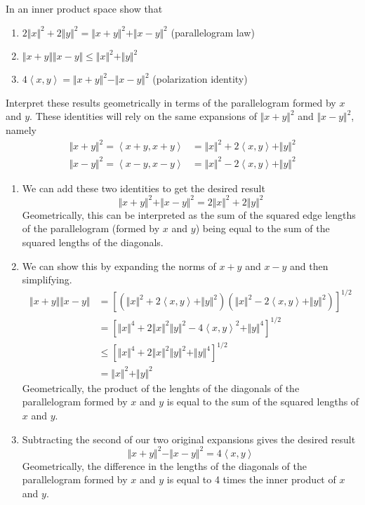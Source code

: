\documentclass[10pt]{amsart}
\theoremstyle{plain}
\newenvironment{exercise}[1]{%
  \renewcommand\themanualtheoreminner{#1}%
  \manualtheoreminner
}{\endmanualtheoreminner}
\theoremstyle{definition}
\newcommand{\<}{\langle}
\renewcommand{\>}{\rangle}
\begin{document}
\begin{exercise}{1.12}
	In an inner product space show that
	\begin{enumerate}
		\item $2\Vert{x}\Vert^2+2\Vert{y}\Vert^2=\Vert{x+y}\Vert^2+\Vert{x-y}\Vert^2$ (parallelogram law)
		\item $\Vert{x+y}\Vert \Vert{x-y}\Vert\leq\Vert{x}\Vert^2+\Vert{y}\Vert^2$
		\item $4\left\langle x,y \right\rangle=\Vert{x+y}\Vert^2-\Vert{x-y}\Vert^2$ (polarization identity)
	\end{enumerate}
	Interpret these results geometrically in terms of the parallelogram formed by $x$ and $y$.
\end{exercise}
	These identities will rely on the same expansions of $\Vert{x+y}\Vert^2$ and $\Vert{x-y}\Vert^2$, namely
	\begin{align*}
		\Vert{x+y}\Vert^2 = \left\langle x+y,x+y \right\rangle &= \Vert{x}\Vert^2 + 2\left\langle x,y \right\rangle+\Vert{y}\Vert^2 \\
		\Vert{x-y}\Vert^2 = \left\langle x-y,x-y \right\rangle &= \Vert{x}\Vert^2 -2\left\langle x,y \right\rangle + \Vert{y}\Vert^2
	\end{align*}
\begin{enumerate}
	\item We can add these two identities to get the desired result
	\[
	\Vert{x+y}\Vert^2 + \Vert{x-y}\Vert^2 = 2\Vert{x}\Vert^2 + 2\Vert{y}\Vert^2
	\] 
	Geometrically, this can be interpreted as the sum of the squared edge lengths of the parallelogram (formed by $x$ and $y$) being equal to the sum of the squared lengths of the diagonals.

	\item 
	We can show this by expanding the norms of $x+y$ and $x-y$ and then simplifying.
	\begin{align*}
		\Vert{x+y}\Vert\Vert{x-y}\Vert &= \left[ \left( \Vert{x}\Vert^2 + 2\left\langle x,y \right\rangle + \Vert{y}\Vert^2 \right)\left( \Vert{x}\Vert^2 -2\left\langle x,y \right\rangle+\Vert{y}\Vert^2 \right) \right]^{1/2} \\
					       &= \left[ \Vert{x}\Vert^4 +2\Vert{x}\Vert^2\Vert{y}\Vert^2 - 4\left\langle x,y \right\rangle^2 + \Vert{y}\Vert^4 \right]^{1/2} \\
					       &\leq \left[ \Vert{x}\Vert^4 +2\Vert{x}\Vert^2\Vert{y}\Vert^2 + \Vert{y}\Vert^4 \right]^{1/2} \\
					       &= \Vert{x}\Vert^2 + \Vert{y}\Vert^2
	\end{align*}
	Geometrically, the product of the lenghts of the diagonals of the parallelogram formed by $x$ and $y$ is equal to the sum of the squared lengths of $x$ and $y$.

	\item 
	Subtracting the second of our two original expansions gives the desired result
	\[
	\Vert{x+y}\Vert^2 - \Vert{x-y}\Vert^2 = 4\left\langle x,y \right\rangle
	\] 
	Geometrically, the difference in the lengths of the diagonals of the parallelogram formed by $x$ and $y$ is equal to 4 times the inner product of $x$ and $y$.
\end{enumerate}
\end{document}
